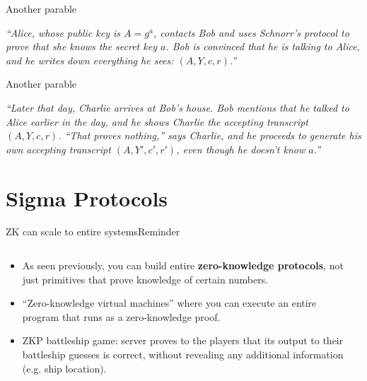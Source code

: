 \documentclass[aspectratio=169, lualatex, handout]{beamer}
\begin{document}
\begin{frame}{Another parable}
	\begin{center}
		\vfill
		\large
		\textit{\rmfamily ``Alice, whose public key is $A = g^a$, contacts Bob and uses Schnorr's protocol to prove that she knows the secret key $a$. Bob is convinced that he is talking to Alice, and he writes down everything he sees: $(A, Y, c, r)$.''}
		\vfill
	\end{center}
\end{frame}

\begin{frame}{Another parable}
	\begin{center}
		\vfill
		\large
		\textit{\rmfamily ``Later that day, Charlie arrives at Bob's house. Bob mentions that he talked to Alice earlier in the day, and he shows Charlie the accepting transcript $(A,Y,c,r)$. ``That proves nothing,'' says Charlie, and he proceeds to generate his own accepting transcript $(A,Y',c',r')$, even though he doesn't know $a$.''}
		\vfill
	\end{center}
\end{frame}

\section{Sigma Protocols}

\begin{frame}{ZK can scale to entire systems}{Reminder}
	\begin{columns}[c]
		\begin{column}{0.6\textwidth}
			\begin{itemize}[<+->]
				\item As seen previously, you can build entire \textbf{zero-knowledge protocols}, not just primitives that prove knowledge of certain numbers.
				\item ``Zero-knowledge virtual machines'' where you can execute
				      an entire program that runs as a zero-knowledge proof.
				\item ZKP battleship game: server proves to the players that its
				      output to their battleship guesses is correct, without revealing any
				      additional information (e.g. ship location).
			\end{itemize}
		\end{column}
		\begin{column}{0.4\textwidth}
		\end{column}
	\end{columns}
\end{frame}
\end{document}
